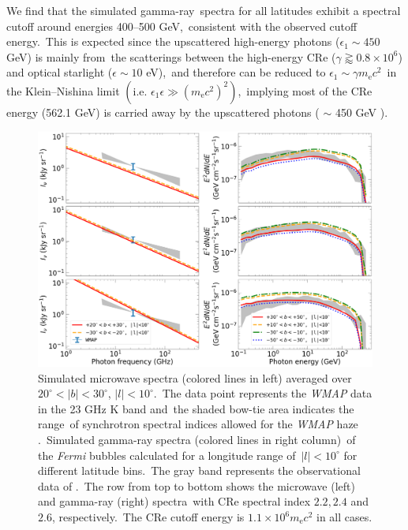 \documentclass[twocolumn]{aastex631}
\begin{document}
We find that the simulated gamma-ray\
spectra for all latitudes exhibit a spectral cutoff around energies 400--500 GeV,\
consistent with the observed cutoff energy.\
This is expected since
the upscattered high-energy photons ($\epsilon_{1}\sim450$ GeV) is mainly from\
the scatterings between the high-energy CRe ($\gamma\gtrapprox0.8\times10^{6}$) and optical starlight ($\epsilon \sim 10$ eV),\
and therefore  can be reduced to $\epsilon_{1}\sim\gamma m_{\text{e}}c^2$\
in the Klein--Nishina limit $\left(\text{i.e. }\epsilon_{1}\epsilon \gg \left(m_{\text{e}}c^2\right)^2\right)$,\
implying most of the CRe energy (562.1 GeV) is carried away by the upscattered photons ( $\sim$ 450 GeV ).

\begin{figure}
  \includegraphics[width=\linewidth]{figures/fig__spectrum.png}
  \caption{
      Simulated microwave spectra (colored lines in left) averaged over $20^{\circ}<|b|<30^{\circ}$, $|l|<10^{\circ}$.\
      The data point represents the \textit{WMAP} data in the 23 GHz K band and\
      the shaded bow-tie area indicates the range\
      of synchrotron spectral indices allowed for the \textit{WMAP} haze \citep{Dobler_2008}.\
      Simulated gamma-ray spectra (colored lines in right column)\
      of the \textit{Fermi} bubbles calculated for a longitude range of\
      $|l|<10^{\circ}$ for different latitude bins.\
      The gray band represents the observational data of \citet{Ackermann2014}.\
      The row from top to bottom shows the microwave (left) and gamma-ray (right) spectra\
      with CRe spectral index $2.2, 2.4$ and $2.6$, respectively.\
      The CRe cutoff energy is $1.1\times10^{6}m_{\text{e}}c^{2}$ in all cases.
  }
  \label{fig__gammaRaySynchtronSpectrum}
\end{figure}
\end{document}

